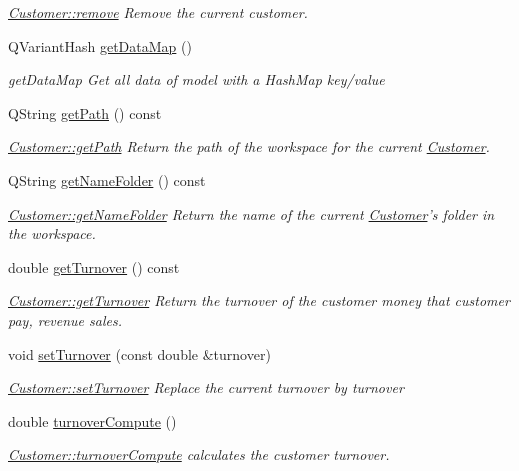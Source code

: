 \begin{DoxyCompactItemize}
\begin{DoxyCompactList}\small\item\em \hyperlink{classModels_1_1Customer_a0f5dba0d90af0adf5d0aca26195d21b1}{Customer\-::remove} Remove the current customer. \end{DoxyCompactList}\item 
Q\-Variant\-Hash \hyperlink{classModels_1_1Customer_ae72b05319056dc482f3f525ef40b8d40}{get\-Data\-Map} ()
\begin{DoxyCompactList}\small\item\em get\-Data\-Map Get all data of model with a Hash\-Map key/value \end{DoxyCompactList}\item 
Q\-String \hyperlink{classModels_1_1Customer_ac1aec0fb9058333e1a2496b1c29049af}{get\-Path} () const 
\begin{DoxyCompactList}\small\item\em \hyperlink{classModels_1_1Customer_ac1aec0fb9058333e1a2496b1c29049af}{Customer\-::get\-Path} Return the path of the workspace for the current \hyperlink{classModels_1_1Customer}{Customer}. \end{DoxyCompactList}\item 
Q\-String \hyperlink{classModels_1_1Customer_ab7c63946125a6b8d876f0f4e2b50c97e}{get\-Name\-Folder} () const 
\begin{DoxyCompactList}\small\item\em \hyperlink{classModels_1_1Customer_ab7c63946125a6b8d876f0f4e2b50c97e}{Customer\-::get\-Name\-Folder} Return the name of the current \hyperlink{classModels_1_1Customer}{Customer}'s folder in the workspace. \end{DoxyCompactList}\item 
double \hyperlink{classModels_1_1Customer_a193fb1920b53048d8a5f7c8e08581e69}{get\-Turnover} () const 
\begin{DoxyCompactList}\small\item\em \hyperlink{classModels_1_1Customer_a193fb1920b53048d8a5f7c8e08581e69}{Customer\-::get\-Turnover} Return the turnover of the customer money that customer pay, revenue sales. \end{DoxyCompactList}\item 
void \hyperlink{classModels_1_1Customer_aee29f27497db5cd37bc835e202c24eac}{set\-Turnover} (const double \&turnover)
\begin{DoxyCompactList}\small\item\em \hyperlink{classModels_1_1Customer_aee29f27497db5cd37bc835e202c24eac}{Customer\-::set\-Turnover} Replace the current turnover by {\itshape turnover} \end{DoxyCompactList}\item 
double \hyperlink{classModels_1_1Customer_abfc72b1cc4b2f1cdb106e0d50cfcb82f}{turnover\-Compute} ()
\begin{DoxyCompactList}\small\item\em \hyperlink{classModels_1_1Customer_abfc72b1cc4b2f1cdb106e0d50cfcb82f}{Customer\-::turnover\-Compute} calculates the customer turnover. \end{DoxyCompactList}\end{DoxyCompactItemize}
